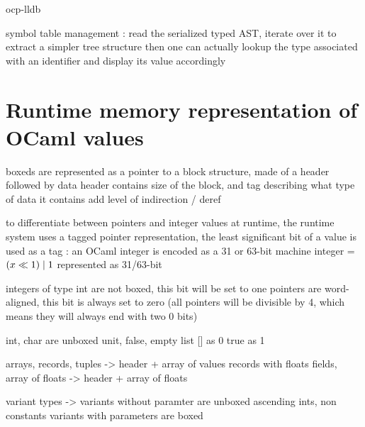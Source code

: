 ocp-lldb

symbol table management :
read the serialized typed AST, iterate over it to extract a simpler tree
structure
then one can actually lookup the type associated with an identifier and display
its value accordingly

\section{Runtime memory representation of OCaml values}

\Glspl{boxed} are represented as a pointer to a block structure, made of a
header followed by data
header contains size of the block, and tag describing what type of data it
contains
add level of indirection / deref

to differentiate between pointers and integer values at runtime, the runtime
system uses a tagged pointer representation, the least significant bit of a
value is used as a tag : an OCaml integer is encoded as a 31 or 63-bit machine integer = $ (x \ll 1) \mathrel{|} 1 $
represented as 31/63-bit

integers of type int are not boxed, this bit will be set to one
pointers are word-aligned, this bit is always set to zero
(all pointers will be divisible by 4, which means they will always end with two
0 bits)

int, char are unboxed
unit, false, empty list [] as 0
true as 1

arrays, records, tuples -> header + array of values
records with floats fields, array of floats -> header + array of floats

variant types -> variants without paramter are unboxed ascending ints, non
constants variants with parameters are boxed
